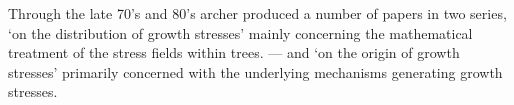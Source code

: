 Through the late 70's and 80's archer produced a number of papers in two series,
`on the distribution of growth stresses' \cite{Archer_1974}\cite{archer1976}\cite{Archer_1979}\cite{Archer_1981}\cite{Archer_1985} mainly concerning the
mathematical treatment of the stress fields within trees. --- and `on the
origin of growth stresses' \cite{archer1987}\cite{archer1989} primarily concerned with the underlying
mechanisms generating growth stresses.